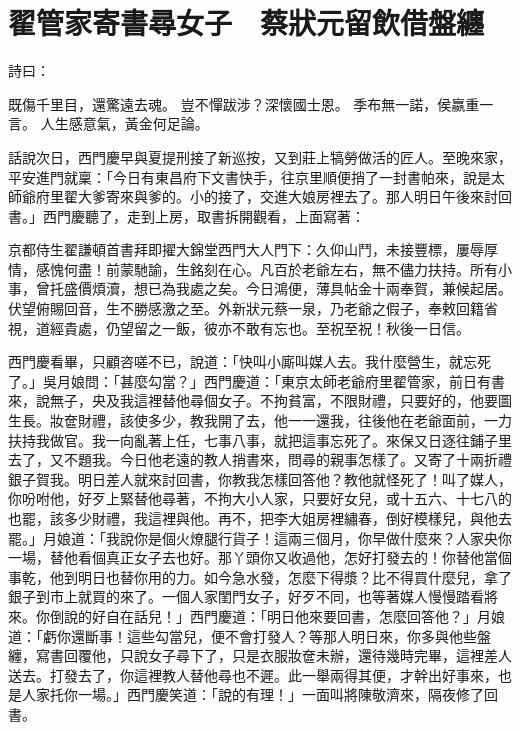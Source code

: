 %

\chapter{翟管家寄書尋女子　蔡狀元留飲借盤纏}

詩曰：

既傷千里目，還驚遠去魂。
豈不憚跋涉？深懷國士恩。
季布無一諾，侯嬴重一言。
人生感意氣，黃金何足論。

話說次日，西門慶早與夏提刑接了新巡按，又到莊上犒勞做活的匠人。至晚來家，平安進門就稟：「今日有東昌府下文書快手，往京里順便捎了一封書帕來，說是太師爺府里翟大爹寄來與爹的。小的接了，交進大娘房裡去了。那人明日午後來討回書。」西門慶聽了，走到上房，取書拆開觀看，上面寫著：

京都侍生翟謙頓首書拜即擢大錦堂西門大人門下：久仰山鬥，未接豐標，屢辱厚情，感愧何盡！前蒙馳諭，生銘刻在心。凡百於老爺左右，無不儘力扶持。所有小事，曾托盛價煩瀆，想已為我處之矣。今日鴻便，薄具帖金十兩奉賀，兼候起居。伏望俯賜回音，生不勝感激之至。外新狀元蔡一泉，乃老爺之假子，奉敕回籍省視，道經貴處，仍望留之一飯，彼亦不敢有忘也。至祝至祝！秋後一日信。

西門慶看畢，只顧咨嗟不已，說道：「快叫小廝叫媒人去。我什麼營生，就忘死了。」吳月娘問：「甚麼勾當？」西門慶道：「東京太師老爺府里翟管家，前日有書來，說無子，央及我這裡替他尋個女子。不拘貧富，不限財禮，只要好的，他要圖生長。妝奩財禮，該使多少，教我開了去，他一一還我，往後他在老爺面前，一力扶持我做官。我一向亂著上任，七事八事，就把這事忘死了。來保又日逐往鋪子里去了，又不題我。今日他老遠的教人捎書來，問尋的親事怎樣了。又寄了十兩折禮銀子賀我。明日差人就來討回書，你教我怎樣回答他？教他就怪死了！叫了媒人，你吩咐他，好歹上緊替他尋著，不拘大小人家，只要好女兒，或十五六、十七八的也罷，該多少財禮，我這裡與他。再不，把李大姐房裡繡春，倒好模樣兒，與他去罷。」月娘道：「我說你是個火燎腿行貨子！這兩三個月，你早做什麼來？人家央你一場，替他看個真正女子去也好。那丫頭你又收過他，怎好打發去的！你替他當個事乾，他到明日也替你用的力。如今急水發，怎麼下得漿？比不得買什麼兒，拿了銀子到市上就買的來了。一個人家閨門女子，好歹不同，也等著媒人慢慢踏看將來。你倒說的好自在話兒！」西門慶道：「明日他來要回書，怎麼回答他？」月娘道：「虧你還斷事！這些勾當兒，便不會打發人？等那人明日來，你多與他些盤纏，寫書回覆他，只說女子尋下了，只是衣服妝奩未辦，還待幾時完畢，這裡差人送去。打發去了，你這裡教人替他尋也不遲。此一舉兩得其便，才幹出好事來，也是人家托你一場。」西門慶笑道：「說的有理！」一面叫將陳敬濟來，隔夜修了回書。

